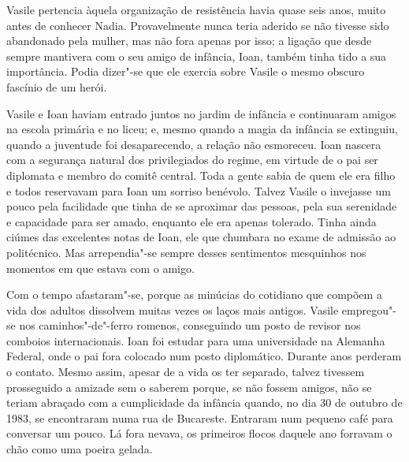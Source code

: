 \bigskip

\noindent{}Vasile pertencia àquela organização de resistência havia quase seis
anos, muito antes de conhecer Nadia. Provavelmente nunca teria aderido
se não tivesse sido abandonado pela mulher, mas não fora apenas por
isso; a ligação que desde sempre mantivera com o seu amigo de infância,
Ioan, também tinha tido a sua importância. Podia dizer"-se que ele
exercia sobre Vasile o mesmo obscuro fascínio de um herói.

Vasile e Ioan haviam entrado juntos no jardim de infância e continuaram amigos na escola primária e no liceu; e, mesmo
quando a magia da infância se extinguiu, quando a juventude foi
desaparecendo, a relação não esmoreceu. Ioan nascera com a segurança
natural dos privilegiados do regime, em virtude de o pai ser diplomata e
membro do comitê central. Toda a gente sabia de quem ele era filho e
todos reservavam para Ioan um sorriso benévolo. Talvez Vasile o
invejasse um pouco pela facilidade que tinha de se aproximar das
pessoas, pela sua serenidade e capacidade para ser amado, enquanto ele
era apenas tolerado. Tinha ainda ciúmes das excelentes notas
de Ioan, ele que chumbara no exame de admissão ao politécnico. Mas
arrependia"-se sempre desses sentimentos mesquinhos nos momentos em que
estava com o amigo.

Com o tempo afastaram"-se, porque as minúcias do
cotidiano que compõem a vida dos adultos dissolvem muitas vezes os
laços mais antigos. Vasile empregou"-se nos caminhos"-de"-ferro romenos,
conseguindo um posto de revisor nos comboios internacionais. Ioan foi
estudar para uma universidade na Alemanha Federal, onde o pai fora
colocado num posto diplomático. Durante anos perderam o contato. Mesmo
assim, apesar de a vida os ter separado, talvez tivessem prosseguido a
amizade sem o saberem porque, se não fossem amigos, não se teriam
abraçado com a cumplicidade da infância quando, no dia 30 de outubro de
1983, se encontraram numa rua de Bucareste. Entraram num pequeno café
para conversar um pouco. Lá fora nevava, os primeiros flocos daquele ano
forravam o chão como uma poeira gelada.

